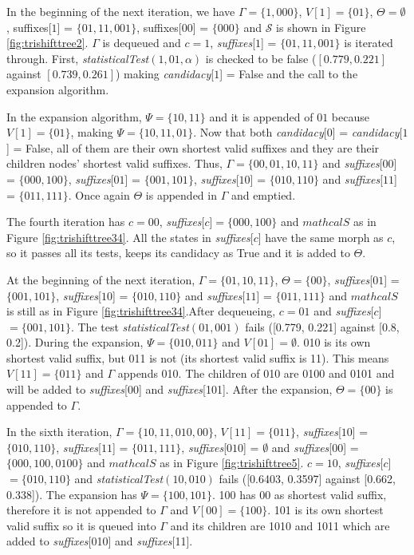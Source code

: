 {In the beginning of the next iteration, we have $\Gamma = \{1, 000\}$, $V[1] = \{01\}$, $\Theta = \emptyset$, suffixes[$1$] = $\{01, 11, 001\}$, suffixes[$00$] = $\{000\}$ and $\mathcal{S}$  is shown in Figure \ref{fig:trishifttree2}. $\Gamma$ is dequeued and $c = 1$, \textit{suffixes}[$1$] = $\{01, 11, 001\}$ is iterated through. First, \textit{statisticalTest}$(1,01,\alpha)$ is checked to be false ($[0.779, 0.221]$ against $[0.739, 0.261]$) making \textit{candidacy}[$1$] = False and the call to the expansion algorithm.

In the expansion algorithm, $\Psi = \{10, 11\}$ and it is appended of $01$ because $V[1] = \{01\}$, making $\Psi = \{10, 11, 01\}$. Now that both \textit{candidacy}[$0$] = \textit{candidacy}[$1$] = False, all of them are their own shortest valid suffixes and they are their children nodes' shortest valid suffixes. Thus, $\Gamma = \{00, 01, 10, 11\}$ and \textit{suffixes}[$00$] = $\{000, 100\}$, \textit{suffixes}[$01$] = $\{001, 101\}$, \textit{suffixes}[$10$] = $\{010, 110\}$ and \textit{suffixes}[$11$] = $\{011, 111\}$. Once again $\Theta$ is appended in $\Gamma$ and emptied.

The fourth iteration has $c = 00$, \textit{suffixes}[$c$]$ = \{000, 100\}$ and $mathcal{S}$ as in Figure \ref{fig:trishifttree34}. All the states in \textit{suffixes}[$c$] have the same morph as $c$, so it passes all its tests, keeps its candidacy as True and it is added to $\Theta$.

At the beginning of the next iteration, $\Gamma = \{01, 10, 11\}$, $\Theta = \{00\}$, \textit{suffixes}[$01$] = $\{001, 101\}$, \textit{suffixes}[$10$] = $\{010, 110\}$ and \textit{suffixes}[$11$] = $\{011, 111\}$ and $mathcal{S}$ is still as in Figure \ref{fig:trishifttree34}.After dequeueing, $c = 01$ and \textit{suffixes}[$c$]$ = \{001, 101\}$. The test \textit{statisticalTest}$(01,001)$ fails ([0.779, 0.221] against [0.8, 0.2]). During the expansion, $\Psi = \{010, 011\}$ and $V[01] = \emptyset$. 010 is its own shortest valid suffix, but 011 is not (its shortest valid suffix is 11). This means $V[11] = \{011\}$ and $\Gamma$ appends 010. The children of 010 are 0100 and 0101 and will be added to \textit{suffixes}[00] and \textit{suffixes}[101]. After the expansion, $\Theta = \{00\}$ is appended to $\Gamma$.

In the sixth iteration, $\Gamma = \{10, 11, 010, 00\}$, $V[11] = \{011\}$, \textit{suffixes}[$10$] = $\{010, 110\}$, \textit{suffixes}[$11$] = $\{011, 111\}$,  \textit{suffixes}[$010$] = $\emptyset$ and  \textit{suffixes}[$00$] = $\{000, 100, 0100\}$ and $mathcal{S}$ as in Figure \ref{fig:trishifttree5}. $c = 10$, \textit{suffixes}[$c$]$ = \{010, 110\}$ and \textit{statisticalTest}$(10,010)$ fails ([0.6403, 0.3597] against [0.662, 0.338]). The expansion has $\Psi = \{100, 101\}$. 100 has 00 as shortest valid suffix, therefore it is not appended to $\Gamma$ and $V[00] = \{100\}$. 101 is its own shortest valid suffix so it is queued into $\Gamma$ and its children are 1010 and 1011 which are added to \textit{suffixes}[010] and \textit{suffixes}[11].

}

